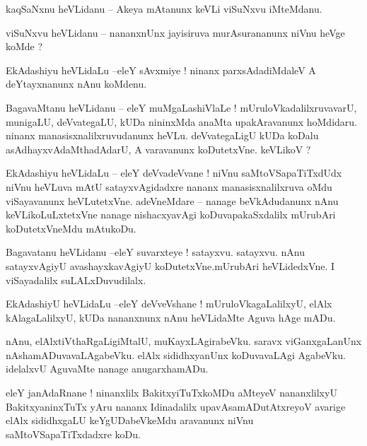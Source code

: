 \documentclass{article}
\begin{document}
\begin{mn}%
kaqSaNxnu heVLidanu -- Akeya mAtanunx keVLi viSuNxvu iMteMdanu.
\end{mn}

\begin{mn}%
viSuNxvu heVLidanu -- nananxnUnx jayisiruva murAsurananunx niVnu heVge koMde ?
\end{mn}

\begin{mn}%
EkAdashiyu heVLidaLu --eleY sAvxmiye ! ninanx parxsAdadiMdaleV A deYtayxnanunx nAnu koMdenu.
\end{mn}

\begin{mn}%
BagavaMtanu heVLidanu -- eleY muMgaLashiVlaLe ! mUruloVkadalilxruvavarU, munigaLU, deVvategaLU, 
kUDa nininxMda anaMta upakAravanunx hoMdidaru. ninanx manasisxnalilxruvudanunx heVLu. 
deVvategaLigU kUDa koDalu asAdhayxvAdaMthadAdarU, A varavanunx koDutetxVne. keVLikoV ?
\end{mn}

\begin{mn}%
EkAdashiyu heVLidaLu -- eleY deVvadeVvane ! niVnu saMtoVSapaTiTxdUdx niVnu heVLuva mAtU 
satayxvAgidadxre nananx manasisxnalilxruva oMdu viSayavanunx heVLutetxVne. adeVneMdare -- nanage 
beVkAdudanunx nAnu keVLikoLuLxtetxVne nanage nishacxyavAgi koDuvapakaSxdalilx mUrubAri 
koDutetxVneMdu mAtukoDu.
\end{mn}

\begin{mn}%
Bagavatanu heVLidanu --eleY suvarxteye ! satayxvu. satayxvu. nAnu satayxvAgiyU avashayxkavAgiyU 
koDutetxVne.mUrubAri heVLidedxVne. I viSayadalilx suLALxDuvudilalx.
\end{mn}

\begin{mn}%
EkAdashiyU heVLidaLu --eleY deVveVshane ! mUruloVkagaLalilxyU, elAlx kAlagaLalilxyU, kUDa 
nananxnunx nAnu heVLidaMte Aguva hAge mADu.
\end{mn}

\begin{mn}%
nAnu, elAlxtiVthaRgaLigiMtalU, muKayxLAgirabeVku. saravx viGanxgaLanUnx nAshamADuvavaLAgabeVku. 
elAlx sididhxyanUnx koDuvavaLAgi AgabeVku. idelalxvU AguvaMte nanage anugarxhamADu.
\end{mn}

\begin{mn}%
eleY janAdaRnane ! ninanxlilx BakitxyiTuTxkoMDu aMteyeV nananxlilxyU BakitxyaninxTuTx yAru nananx 
Idinadalilx upavAsamADutAtxreyoV avarige elAlx sididhxgaLU keYgUDabeVkeMdu aravanunx niVnu 
saMtoVSapaTiTxdadxre koDu.
\end{mn}
\end{document}
